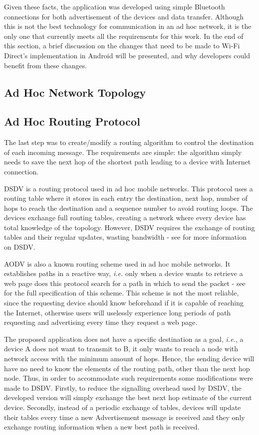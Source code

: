 Given these facts, the application was developed using simple Bluetooth connections for both advertisement of the devices and data transfer. Although this is not the best technology for communication in an ad hoc network, it is the only one that currently meets all the requirements for this work. In the end of this section, a brief discussion on the changes that need to be made to Wi-Fi Direct's implementation in Android will be presented, and why developers could benefit from these changes.

\subsection{Ad Hoc Network Topology}

\subsection{Ad Hoc Routing Protocol}
\label{subsec:routprot}

The last step was to create/modify a routing algorithm to control the destination of each incoming message. The requirements are simple: the algorithm simply needs to save the next hop of the shortest path leading to a device with Internet connection.

\gls{DSDV} is a routing protocol used in ad hoc mobile networks. This protocol uses a routing table where it stores in each entry the destination, next hop, number of hops to reach the destination and a sequence number to avoid routing loops. The devices exchange full routing tables, creating a network where every device has total knowledge of the topology. However, \gls{DSDV} requires the exchange of routing tables and their regular updates, wasting bandwidth - see \cite{dsdv} for more information on \gls{DSDV}.

\gls{AODV} is also a known routing scheme used in ad hoc mobile networks. It establishes paths in a reactive way, \textit{i.e.} only when a device wants to retrieve a web page does this protocol search for a path in which to send the packet - see \cite{aodv} for the full specification of this scheme. This scheme is not the most reliable, since the requesting device should know beforehand if it is capable of reaching the Internet, otherwise users will uselessly experience long periods of path requesting and advertising every time they request a web page.

The proposed application does not have a specific destination as a goal, \textit{i.e.}, a device A does not want to transmit to B, it only wants to reach a node with network access with the minimum amount of hops. Hence, the sending device will have no need to know the elements of the routing path, other than the next hop node. Thus, in order to accommodate such requirements some modifications were made to \gls{DSDV}. Firstly, to reduce the signalling overhead used by \gls{DSDV}, the developed version will simply exchange the best next hop estimate of the current device. Secondly, instead of a periodic exchange of tables, devices will update their tables every time a new Advertisement message is received and they only exchange routing information when a new best path is received.


